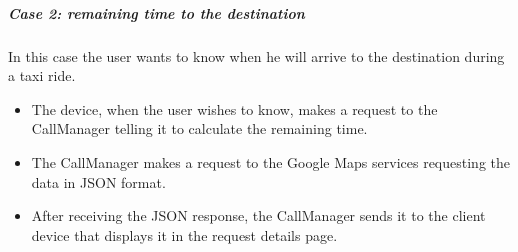 \subparagraph{Case 2: remaining time to the destination}
In this case the user wants to know when he will arrive to the destination during a taxi ride.
\begin{itemize}
    \item The device, when the user wishes to know, makes a request to the CallManager telling it to calculate the remaining time.
    \item The CallManager makes a request to the Google Maps services requesting the data in JSON format.
    \item After receiving the JSON response, the CallManager sends it to the client device that displays it in the request details page.
\end{itemize}

